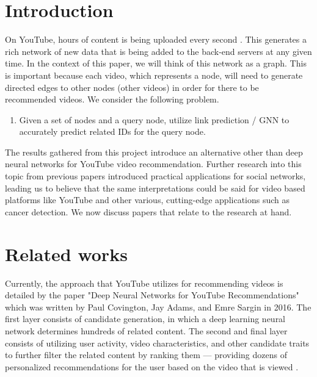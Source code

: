 \documentclass[10pt,twocolumn,letterpaper]{article}
\begin{document}
\section{Introduction}


On YouTube, hours of content is being uploaded every second \cite{youtube-original}. This generates a rich network of new data that is being added to the back-end servers at any given time. In the context of this paper, we will think of this network as a graph. This is important because each video, which represents a node, will need to generate directed edges to other nodes (other videos) in order for there to be recommended videos. We consider the following problem.

\begin{enumerate}
    \item Given a set of nodes and a query node, utilize link prediction / GNN to accurately predict related IDs for the query node.
\end{enumerate}


The results gathered from this project introduce an alternative other than deep neural networks for YouTube video recommendation. Further research into this topic from previous papers introduced practical applications for social networks, leading us to believe that the same interpretations could be said for video based platforms like YouTube and other various, cutting-edge applications such as cancer detection. We now discuss papers that relate to the research at hand.


\section{Related works}

Currently, the approach that YouTube utilizes for recommending videos is detailed by the paper "Deep Neural Networks for YouTube Recommendations" which was written by Paul Covington, Jay Adams, and Emre Sargin in 2016. The first layer consists of candidate generation, in which a deep learning neural network determines hundreds of related content. The second and final layer consists of utilizing user activity, video characteristics, and other candidate traits to further filter the related content by ranking them --- providing dozens of personalized recommendations for the user based on the video that is viewed \cite{youtube-original}.
\end{document}
